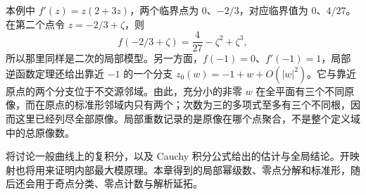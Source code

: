 \ProseParagraphBreak

本例中 \(f'(z)=z(2+3z)\)，两个临界点为 \(0\)、\(-2/3\)，对应临界值为 \(0\)、\(4/27\)。在第二个点令 \(z=-2/3+\zeta\)，则
\[
 f(-2/3+\zeta)=\frac4{27}-\zeta^2+\zeta^3,
\]
所以那里同样是二次的局部模型。另一方面，\(f(-1)=0\)、\(f'(-1)=1\)，局部逆函数定理还给出靠近 \(-1\) 的一个分支 \(z_0(w)=-1+w+O(|w|^2)\)。它与靠近原点的两个分支位于不交源邻域。由此，充分小的非零 \(w\) 在全平面有三个不同原像，而在原点的标准形邻域内只有两个；次数为三的多项式至多有三个不同根，因而这里已经列尽全部原像。局部重数记录的是原像在哪个点聚合，不是整个定义域中的总原像数。

\ProseParagraphBreak

将讨论一般曲线上的复积分，以及 Cauchy 积分公式给出的估计与全局结论。开映射也将用来证明内部最大模原理。本章得到的局部幂级数、零点分解和标准形，随后还会用于奇点分类、零点计数与解析延拓。
